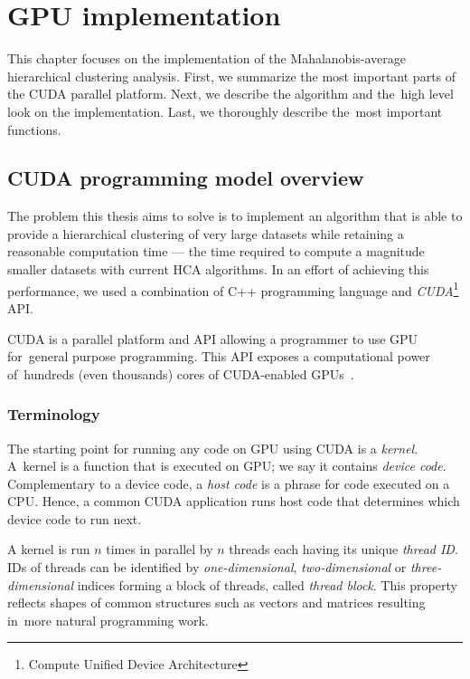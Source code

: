 \chapter{GPU implementation}

This chapter focuses on the implementation of the Mahalanobis-average hierarchical clustering analysis. First, we summarize the most important parts of the CUDA parallel platform. Next, we describe the algorithm and the~high level look on the implementation. Last, we thoroughly describe the~most important functions.

\section{CUDA programming model overview}

The problem this thesis aims to solve is to implement an algorithm that is able to provide a hierarchical clustering of very large datasets while retaining a reasonable computation time --- the time required to compute a magnitude smaller datasets with current HCA algorithms.
In an effort of achieving this performance, we used a combination of C++ programming language and \emph{CUDA}\footnote{Compute Unified Device Architecture} API.

CUDA is a parallel platform and API allowing a programmer to use GPU for~general purpose programming. This API exposes a computational power of~hundreds (even thousands) cores of CUDA-enabled GPUs~\cite{cuda}.


\subsection{Terminology}

The starting point for running any code on GPU using CUDA is a \emph{kernel}. A~kernel is a function that is executed on GPU; we say it contains \emph{device code}. Complementary to a device code, a \emph{host code} is a phrase for code executed on a CPU. Hence, a common CUDA application runs host code that determines which device code to run next. 

A kernel is run $n$ times in parallel by $n$ threads each having its unique \emph{thread ID}. IDs of threads can be identified by \emph{one-dimensional}, \emph{two-dimensional} or \emph{three-dimensional} indices forming a block of threads, called \emph{thread block}. This property reflects shapes of common structures such as vectors and matrices resulting in~more natural programming work.

